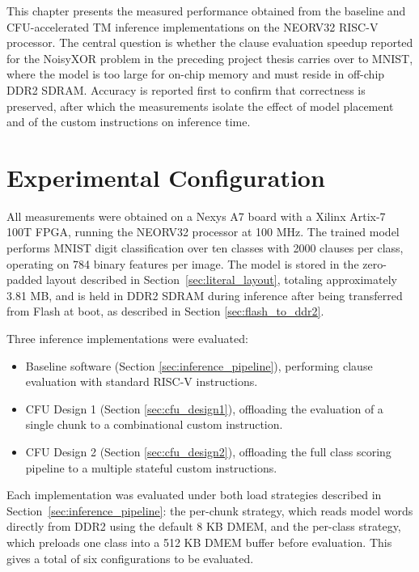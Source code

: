 This chapter presents the measured performance obtained from the baseline and CFU-accelerated TM inference implementations on the NEORV32 RISC-V processor. The central question is whether the clause evaluation speedup reported for the NoisyXOR problem in the preceding project thesis \cite{JB2025} carries over to MNIST, where the model is too large for on-chip memory and must reside in off-chip DDR2 SDRAM. Accuracy is reported first to confirm that correctness is preserved, after which the measurements isolate the effect of model placement and of the custom instructions on inference time.

\section{Experimental Configuration}
\label{sec:results_experimental}

All measurements were obtained on a Nexys A7 board with a Xilinx Artix-7 100T FPGA, running the NEORV32 processor at 100 MHz. The trained model performs MNIST digit classification over ten classes with 2000 clauses per class, operating on 784 binary features per image. The model is stored in the zero-padded layout described in Section~\ref{sec:literal_layout}, totaling approximately 3.81 MB, and is held in DDR2 SDRAM during inference after being transferred from Flash at boot, as described in Section \ref{sec:flash_to_ddr2}.

Three inference implementations were evaluated:

\begin{itemize}
    \item Baseline software (Section \ref{sec:inference_pipeline}), performing clause evaluation with standard RISC-V
    instructions.
    \item CFU Design 1 (Section \ref{sec:cfu_design1}), offloading the evaluation of a single chunk to a
    combinational custom instruction.
    \item CFU Design 2 (Section \ref{sec:cfu_design2}), offloading the full class scoring pipeline to a multiple stateful custom instructions.
\end{itemize}

Each implementation was evaluated under both load strategies described in Section~\ref{sec:inference_pipeline}: the per-chunk strategy, which reads model words directly from DDR2 using the default 8 KB DMEM, and the per-class strategy, which preloads one class into a 512 KB DMEM buffer before evaluation. This gives a total of six configurations to be evaluated.

